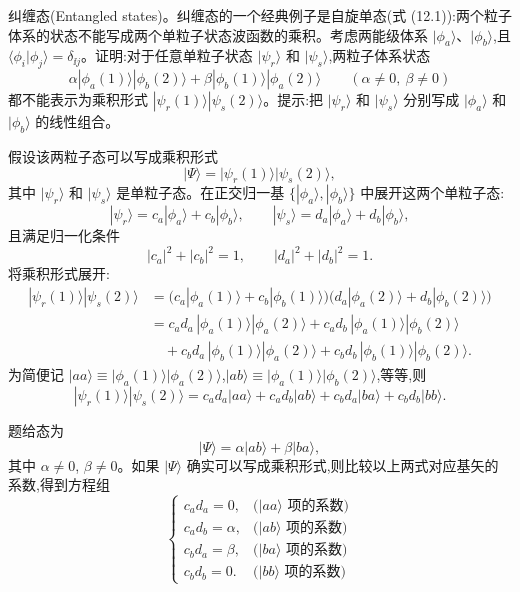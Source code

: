 \begin{question}
纠缠态(Entangled states)。纠缠态的一个经典例子是自旋单态(式 (12.1)):两个粒子体系的状态不能写成两个单粒子状态波函数的乘积。考虑两能级体系 $|\phi_a\rangle$、$|\phi_b\rangle$,且 $\langle\phi_i|\phi_j\rangle=\delta_{\ii j}$。证明:对于任意单粒子状态 $|\psi_r\rangle$ 和 $|\psi_s\rangle$,两粒子体系状态
\[
\alpha|\phi_a(1)\rangle|\phi_b(2)\rangle+\beta|\phi_b(1)\rangle|\phi_a(2)\rangle\qquad(\alpha\ne0,\ \beta\ne0)
\]
都不能表示为乘积形式 $|\psi_r(1)\rangle|\psi_s(2)\rangle$。提示:把 $|\psi_r\rangle$ 和 $|\psi_s\rangle$ 分别写成 $|\phi_a\rangle$ 和 $|\phi_b\rangle$ 的线性组合。

\par\smallskip
{}

\begin{solution}
假设该两粒子态可以写成乘积形式
\[
|\Psi\rangle=|\psi_r(1)\rangle|\psi_s(2)\rangle,
\]
其中 $|\psi_r\rangle$ 和 $|\psi_s\rangle$ 是单粒子态。在正交归一基 $\{|\phi_a\rangle,|\phi_b\rangle\}$ 中展开这两个单粒子态:
\[
|\psi_r\rangle=c_a|\phi_a\rangle+c_b|\phi_b\rangle,\qquad
|\psi_s\rangle=d_a|\phi_a\rangle+d_b|\phi_b\rangle,
\]
且满足归一化条件
\[
|c_a|^2+|c_b|^2=1,\qquad |d_a|^2+|d_b|^2=1.
\]
将乘积形式展开:
\[
\begin{aligned}
|\psi_r(1)\rangle|\psi_s(2)\rangle
&=\bigl(c_a|\phi_a(1)\rangle+c_b|\phi_b(1)\rangle\bigr)\bigl(d_a|\phi_a(2)\rangle+d_b|\phi_b(2)\rangle\bigr)\\[2mm]
&=c_a d_a\,|\phi_a(1)\rangle|\phi_a(2)\rangle
+ c_a d_b\,|\phi_a(1)\rangle|\phi_b(2)\rangle\\
&\quad + c_b d_a\,|\phi_b(1)\rangle|\phi_a(2)\rangle
+ c_b d_b\,|\phi_b(1)\rangle|\phi_b(2)\rangle.
\end{aligned}
\]
为简便记 $|aa\rangle\equiv|\phi_a(1)\rangle|\phi_a(2)\rangle$,$|ab\rangle\equiv|\phi_a(1)\rangle|\phi_b(2)\rangle$,等等,则
\[
|\psi_r(1)\rangle|\psi_s(2)\rangle
=c_a d_a|aa\rangle + c_a d_b|ab\rangle + c_b d_a|ba\rangle + c_b d_b|bb\rangle.
\]

题给态为
\[
|\Psi\rangle=\alpha|ab\rangle+\beta|ba\rangle,
\]
其中 $\alpha\neq0$, $\beta\neq0$。如果 $|\Psi\rangle$ 确实可以写成乘积形式,则比较以上两式对应基矢的系数,得到方程组
\[
\begin{cases}
c_a d_a = 0, & \text{($|aa\rangle$ 项的系数)}\\[2pt]
c_a d_b = \alpha, & \text{($|ab\rangle$ 项的系数)}\\[2pt]
c_b d_a = \beta, & \text{($|ba\rangle$ 项的系数)}\\[2pt]
c_b d_b = 0. & \text{($|bb\rangle$ 项的系数)}
\end{cases}
\]


\end{solution}
\end{question}
